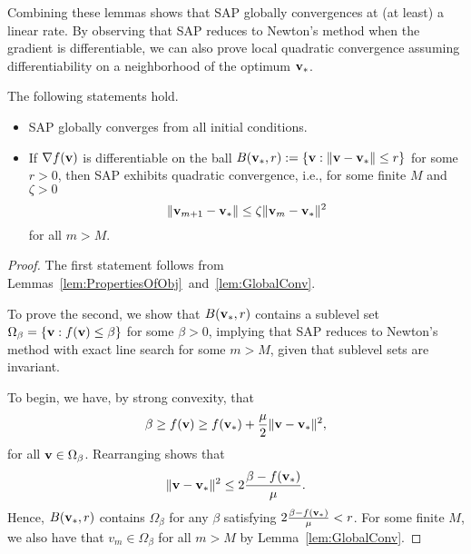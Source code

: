 Combining these lemmas shows that SAP globally convergences at (at least) a
linear rate.  By observing that SAP reduces to Newton's
method when the gradient is differentiable, we can also prove local quadratic
convergence assuming differentiability on a neighborhood of
the optimum ${\mathbf{v}}_*$. 
\begin{theorem}
  The following statements hold.
  \begin{itemize}
    \item SAP globally converges from all initial conditions.
    \item If $\nabla f({\mathbf{v}})$  is differentiable on the ball $B({\mathbf{v}}_*, r) := \{ {\mathbf{v}} :  \|{\mathbf{v}}-{\mathbf{v}}_*\| \le r\}$
  for some $r > 0$, then SAP exhibits quadratic convergence, i.e., for some finite
  $M$ and $\zeta > 0$
  \[
    \|{\mathbf{v}}_{m+1} - {\mathbf{v}}_*\| \le \zeta \|{\mathbf{v}}_{m} - {\mathbf{v}}_*\|^2
  \]
  for all $m > M$.
  \end{itemize}

  \begin{proof}

    The first statement follows from Lemmas~\ref{lem:PropertiesOfObj}~and~\ref{lem:GlobalConv}.

  To prove the second, we show that $B({\mathbf{v}}_*, r)$
    contains a sublevel set $\Omega_{\beta} = \{ {\mathbf{v}} : f({\mathbf{v}}) \le \beta\}$ for some
  $\beta > 0$,  implying that SAP 
  reduces to Newton's method with exact line search for some $m > M$,
 given that sublevel sets are invariant. 

  To begin, we have, by strong convexity, that
  \begin{equation}
    \beta \ge f(\vx) \ge f(\vx_*)  + \frac{\mu}{2} \|\vx-\vx_*\|^2,
    \label{eq:strong_convexity_at_differentiable_optimal}
  \end{equation}
    for all ${\mathbf{v}} \in \Omega_{\beta}$.
    Rearranging shows that
    \[
      \|{\mathbf{v}}-{\mathbf{v}}_*\|^2 \le 2\frac{\beta- f({\mathbf{v}}_*)}{\mu}.
    \]
    Hence, $B({\mathbf{v}}_*, r)$ contains
    $\Omega_{\beta}$ for any $\beta$ satisfying $2\frac{\beta- f({\mathbf{v}}_*)}{\mu} < r$.
    For some finite $M$, we also have that $v_m \in \Omega_{\beta}$ for all $m > M$ 
    by Lemma~\ref{lem:GlobalConv}.


\end{proof}
\end{theorem}
